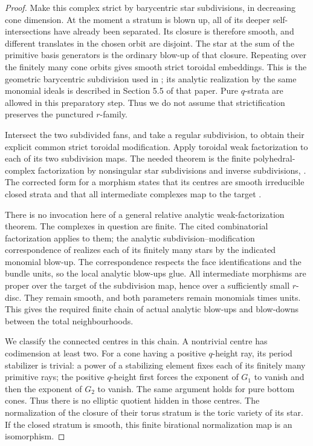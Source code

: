 \begin{proof}
Make this complex strict by barycentric star subdivisions,
in decreasing cone dimension. At the moment a stratum
is blown up, all of its deeper self-intersections have
already been separated. Its closure is therefore smooth,
and different translates in the chosen orbit are disjoint.
The star at the sum of the primitive basis generators is
the ordinary blow-up of that closure. Repeating over the
finitely many cone orbits gives smooth strict toroidal
embeddings. This is the geometric barycentric subdivision
used in \cite[Section 5.6, pp.565--566]{AKMW02AB}; its
analytic realization by the same monomial ideals is
described in Section 5.5 of that paper. Pure $q$-strata
are allowed in this preparatory step. Thus we do not
assume that strictification preserves the punctured
$r$-family.

Intersect the two subdivided fans, and take a regular
subdivision, to obtain their explicit common strict
toroidal modification. Apply toroidal weak factorization
to each of its two subdivision maps. The needed theorem
is the finite polyhedral-complex factorization by
nonsingular star subdivisions and inverse subdivisions,
\cite[Theorems 1.6.1 and 2.7.1]{AKMW02AB}. The corrected
form for a morphism states that its centres are smooth
irreducible closed strata and that all intermediate
complexes map to the target
\cite[Section 2, p.2]{Matsuki00ErrAB}.

There is no invocation here of a general relative
analytic weak-factorization theorem. The complexes in
question are finite. The cited combinatorial
factorization applies to them; the analytic
subdivision--modification correspondence of
\cite[Section 5.5]{AKMW02AB} realizes each of its finitely
many stars by the indicated monomial blow-up.
The correspondence respects the face identifications
and the bundle units, so the local analytic blow-ups
glue. All intermediate morphisms are proper over the
target of the subdivision map, hence over a sufficiently
small $r$-disc. They remain smooth, and both parameters
remain monomials times units. This gives the required
finite chain of actual analytic blow-ups and blow-downs
between the total neighbourhoods.

We classify the connected centres in this chain. A
nontrivial centre has codimension at least two. For a
cone having a positive $q$-height ray, its period
stabilizer is trivial: a power of a stabilizing element
fixes each of its finitely many primitive rays; the
positive $q$-height first forces the exponent of $G_1$
to vanish and then the exponent of $G_2$ to vanish.
The same argument holds for pure bottom cones. Thus
there is no elliptic quotient hidden in those centres.
The normalization of the closure of their torus stratum
is the toric variety of its star. If the closed stratum
is smooth, this finite birational normalization map is
an isomorphism.


\end{proof}
